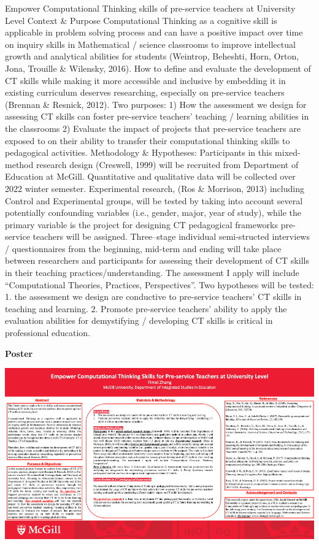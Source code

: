 \documentclass[
]{book}
\begin{document}
Empower Computational Thinking skills of pre-service teachers at University Level Context \& Purpose Computational Thinking as a cognitive skill is applicable in problem solving process and can have a positive impact over time on inquiry skills in Mathematical / science classrooms to improve intellectual growth and analytical abilities for students (Weintrop, Beheshti, Horn, Orton, Jona, Trouille \& Wilensky, 2016). How to define and evaluate the development of CT skills while making it more accessible and inclusive by embedding it in existing curriculum deserves researching, especially on pre-service teachers (Brennan \& Resnick, 2012). Two purposes: 1) How the assessment we design for assessing CT skills can foster pre-service teachers' teaching / learning abilities in the classrooms 2) Evaluate the impact of projects that pre-service teachers are exposed to on their ability to transfer their computational thinking skills to pedagogical activities. Methodology \& Hypotheses: Participants in this mixed-method research design (Creswell, 1999) will be recruited from Department of Education at McGill. Quantitative and qualitative data will be collected over 2022 winter semester. Experimental research, (Ros \& Morrison, 2013) including Control and Experimental groups, will be tested by taking into account several potentially confounding variables (i.e., gender, major, year of study), while the primary variable is the project for designing CT pedagogical frameworks pre-service teachers will be assigned. Three--stage individual semi-structed interviews / questionnaires from the beginning, mid-term and ending will take place between researchers and participants for assessing their development of CT skills in their teaching practices/understanding. The assessment I apply will include ``Computational Theories, Practices, Perspectives''. Two hypotheses will be tested: 1. the assessment we design are conductive to pre-service teachers' CT skills in teaching and learning. 2. Promote pre-service teachers' ability to apply the evaluation abilities for demystifying / developing CT skills is critical in professional education.

\textbf{Poster}

\includegraphics{Content/YZ.png}
\end{document}

